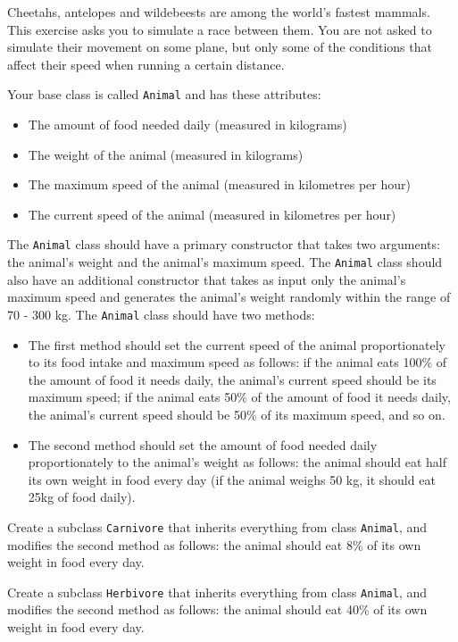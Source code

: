 Cheetahs, antelopes and wildebeests are among the world's fastest mammals. This exercise asks you to simulate a race between them. You are not asked to simulate their movement on some plane, but only some of the conditions that affect their speed when running a certain distance. 
  
  Your base class is called \texttt{Animal} and has these attributes: 
  \begin{itemize}
  \item The amount of food needed daily (measured in kilograms)
  \item The weight of the animal (measured in kilograms)
  \item The maximum speed of the animal (measured in kilometres per hour)
  \item The current speed of the animal (measured in kilometres per hour)
  \end{itemize}
  The \texttt{Animal} class should have a primary constructor that takes two arguments: the animal's weight and the animal's maximum speed. The \texttt{Animal} class should also have an additional constructor that takes as input only the animal's maximum speed and generates the animal's weight randomly within the range of 70 - 300 kg. The \texttt{Animal} class should have two methods:
  \begin{itemize}
  \item The first method should set the current speed of the animal proportionately to its food intake and maximum speed as follows: if the animal eats 100\% of the amount of food it needs daily, the animal's current speed should be its maximum speed; if the animal eats 50\% of the amount of food it needs daily, the animal's current speed should be 50\% of its maximum speed, and so on.
  \item The second method should set the amount of food needed daily proportionately to the animal's weight as follows: the animal should eat half its own weight in food every day (if the animal weighs 50 kg, it should eat 25kg of food daily).
  \end{itemize}
  
  
  Create a subclass \texttt{Carnivore} that inherits everything from class \texttt{Animal}, and modifies the second method as follows: the animal should eat 8\% of its own weight in food every day.
  
  Create a subclass \texttt{Herbivore} that inherits everything from class \texttt{Animal}, and modifies the second method as follows: the animal should eat 40\% of its own weight in food every day.
  
